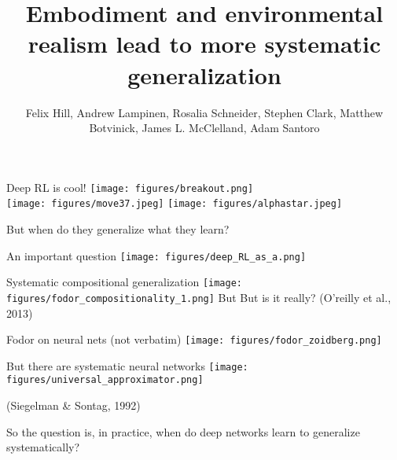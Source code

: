 \documentclass{beamer}
\begin{document}
\title{Embodiment and environmental realism lead to more systematic generalization}
\author{Felix Hill, Andrew Lampinen, Rosalia Schneider, Stephen Clark, Matthew Botvinick, James L. McClelland, Adam Santoro}
\date{}
\frame{\titlepage}

\begin{frame}{Deep RL is cool!}
\vspace{0.5em}
\centering
\texttt{[image: figures/breakout.png]}\\[-2pt]
\texttt{[image: figures/move37.jpeg]}%
\texttt{[image: figures/alphastar.jpeg]}
\end{frame}

\begin{frame}[standout]
But when do they generalize what they learn? 
\end{frame}

\begin{frame}{An important question}
\centering
\texttt{[image: figures/deep\_RL\_as\_a.png]}
\end{frame}

\begin{frame}{Systematic compositional generalization}
\vspace{-2em}
{
\centering
\texttt{[image: figures/fodor\_compositionality\_1.png]}
}
\vspace{-4em}
{\small But But is it really? (O'reilly et al., 2013)} %
\end{frame}

\begin{frame}{Fodor on neural nets (not verbatim)}
\centering
\texttt{[image: figures/fodor\_zoidberg.png]}
\end{frame}


\begin{frame}{But there are systematic neural networks}
\vspace{5em}
{
\centering
\texttt{[image: figures/universal\_approximator.png]}
}
\vspace{3em}

{\small (Siegelman \& Sontag, 1992)}
\end{frame}

\begin{frame}[standout]
So the question is, in practice, when do deep networks learn to generalize systematically? 
\end{frame}
\end{document}

